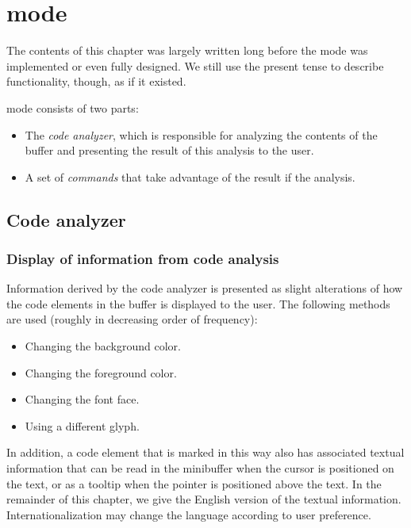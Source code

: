 \chapter{\commonlisp{} mode}

The contents of this chapter was largely written long before the
\commonlisp{} mode was implemented or even fully designed.  We still
use the present tense to describe functionality, though, as if it
existed.

\commonlisp{} mode consists of two parts:

\begin{itemize}
\item The \emph{code analyzer}, which is responsible for analyzing
  the contents of the buffer and presenting the result of this
  analysis to the user.
\item A set of \emph{commands} that take advantage of the result if
  the analysis. 
\end{itemize}

\section{Code analyzer}

\subsection{Display of information from code analysis}

Information derived by the code analyzer is presented as slight
alterations of how the code elements in the buffer is displayed to the
user.  The following methods are used (roughly in decreasing order of
frequency):

\begin{itemize}
\item Changing the background color.
\item Changing the foreground color.
\item Changing the font face.
\item Using a different glyph.
\end{itemize}

In addition, a code element that is marked in this way also has
associated textual information that can be read in the minibuffer when
the cursor is positioned on the text, or as a tooltip when the pointer
is positioned above the text.  In the remainder of this chapter, we
give the English version of the textual information.
Internationalization may change the language according to user
preference.

